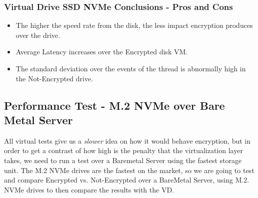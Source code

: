 \subsubsection{Virtual Drive SSD NVMe Conclusions - Pros and Cons}
\begin{itemize}
  \item The higher the speed rate from the disk, the less impact encryption produces over the drive.
  \item Average Latency increases over the Encrypted disk VM.
  \item The standard deviation over the events of the thread is abnormally high in the Not-Encrypted drive.
\end{itemize}

\newpage
\subsection{Performance Test - M.2 NVMe over Bare Metal Server}
All virtual tests give us a \textit{slower} idea on how it would behave encryption, but in order to get a contrast of how high is the penalty that the virtualization layer takes, we need to run a test over a Baremetal Server using the fastest storage unit. The M.2 NVMe drives are the fastest on the market, so we are going to test and compare Encrypted vs. Not-Encrypted over a BareMetal Server, using M.2. NVMe drives to then compare the results with the VD.
